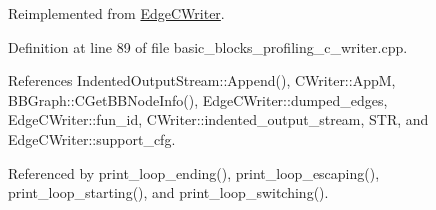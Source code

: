 Reimplemented from \hyperlink{classEdgeCWriter_afafb806eb259b1e582c4b4cd9abe201a}{Edge\+C\+Writer}.



Definition at line 89 of file basic\+\_\+blocks\+\_\+profiling\+\_\+c\+\_\+writer.\+cpp.



References Indented\+Output\+Stream\+::\+Append(), C\+Writer\+::\+AppM, B\+B\+Graph\+::\+C\+Get\+B\+B\+Node\+Info(), Edge\+C\+Writer\+::dumped\+\_\+edges, Edge\+C\+Writer\+::fun\+\_\+id, C\+Writer\+::indented\+\_\+output\+\_\+stream, S\+TR, and Edge\+C\+Writer\+::support\+\_\+cfg.



Referenced by print\+\_\+loop\+\_\+ending(), print\+\_\+loop\+\_\+escaping(), print\+\_\+loop\+\_\+starting(), and print\+\_\+loop\+\_\+switching().

